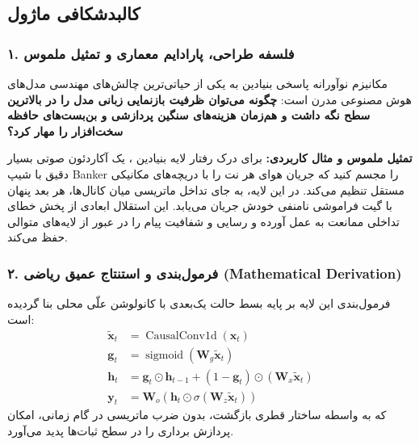 \subsection{کالبدشکافی ماژول }

\subsubsection*{۱. فلسفه طراحی، پارادایم معماری و تمثیل ملموس}
مکانیزم نوآورانه  پاسخی بنیادین به یکی از حیاتی‌ترین چالش‌های مهندسی مدل‌های هوش مصنوعی مدرن است: \textbf{چگونه می‌توان ظرفیت بازنمایی زبانی مدل را در بالاترین سطح نگه داشت و هم‌زمان هزینه‌های سنگین پردازشی و بن‌بست‌های حافظه سخت‌افزار را مهار کرد؟}

\textbf{تمثیل ملموس و مثال کاربردی:}
برای درک رفتار لایه بنیادین ، یک آکاردئون صوتی بسیار دقیق با شیپ Banker را مجسم کنید که جریان هوای هر نت را با دریچه‌های مکانیکی مستقل تنظیم می‌کند. در این لایه، به جای تداخل ماتریسی میان کانال‌ها، هر بعد پنهان با گیت فراموشی نامنفی خودش جریان می‌یابد. این استقلال ابعادی از پخش خطای تداخلی ممانعت به عمل آورده و رسایی و شفافیت پیام را در عبور از لایه‌های متوالی حفظ می‌کند.

\subsubsection*{۲. فرمول‌بندی و استنتاج عمیق ریاضی (Mathematical Derivation)}
فرمول‌بندی این لایه بر پایه بسط حالت یک‌بعدی با کانولوشن علّی محلی بنا گردیده است:
\begin{align}
\tilde{\mathbf{x}}_t &= \operatorname{CausalConv1d}(\mathbf{x}_t) \\
\mathbf{g}_t &= \operatorname{sigmoid}(\mathbf{W}_g \tilde{\mathbf{x}}_t) \\
\mathbf{h}_t &= \mathbf{g}_t \odot \mathbf{h}_{t-1} + (1 - \mathbf{g}_t) \odot (\mathbf{W}_x \tilde{\mathbf{x}}_t) \\
\mathbf{y}_t &= \mathbf{W}_o (\mathbf{h}_t \odot \sigma(\mathbf{W}_z \tilde{\mathbf{x}}_t))
\end{align}
که به واسطه ساختار قطری بازگشت، بدون ضرب ماتریسی در گام زمانی، امکان پردازش برداری را در سطح ثبات‌ها پدید می‌آورد.

